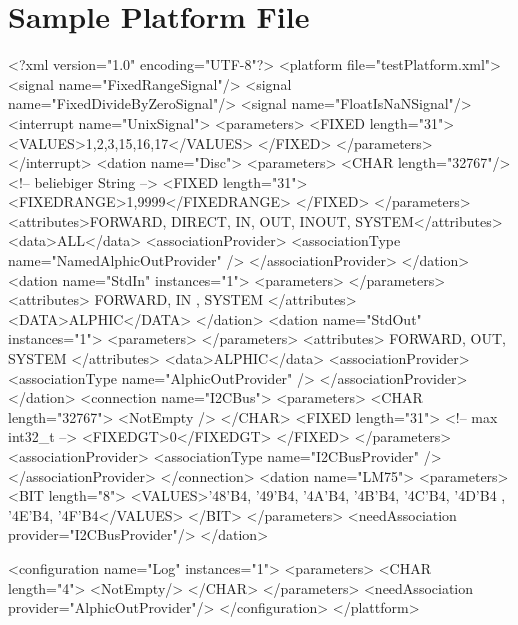 \section{Sample Platform File}
\begin{XMLCode}
<?xml version="1.0" encoding="UTF-8"?>
<platform file="testPlatform.xml">
      <signal name="FixedRangeSignal"/>
      <signal name="FixedDivideByZeroSignal"/>
      <signal name="FloatIsNaNSignal"/>
      <interrupt name="UnixSignal">
         <parameters>
            <FIXED length="31">
               <VALUES>1,2,3,15,16,17</VALUES>
            </FIXED>
         </parameters>
      </interrupt>
      <dation name="Disc">
         <parameters>
            <CHAR length="32767"/>	<!-- beliebiger String -->
            <FIXED length="31">
               <FIXEDRANGE>1,9999</FIXEDRANGE>
            </FIXED>
         </parameters>
         <attributes>FORWARD, DIRECT, IN, OUT, INOUT, SYSTEM</attributes>
         <data>ALL</data>
         <associationProvider>
            <associationType name="NamedAlphicOutProvider" />
         </associationProvider>
      </dation>
      <dation name="StdIn" instances="1">
         <parameters>
         </parameters>
         <attributes>
            FORWARD, IN	, SYSTEM
         </attributes>
         <DATA>ALPHIC</DATA>
      </dation>
      <dation name="StdOut" instances="1">
         <parameters>
         </parameters>
	 <attributes>
            FORWARD, OUT, SYSTEM
         </attributes>
         <data>ALPHIC</data>
         <associationProvider>
            <associationType name="AlphicOutProvider" />
         </associationProvider>
      </dation>
      <connection name="I2CBus">
         <parameters>
            <CHAR length="32767">
               <NotEmpty />
            </CHAR>
            <FIXED length="31">	<!-- max int32_t -->
               <FIXEDGT>0</FIXEDGT>
            </FIXED>
         </parameters>
         <associationProvider>
            <associationType name="I2CBusProvider" />
         </associationProvider>
      </connection>
      <dation name="LM75">
         <parameters>
            <BIT length="8">
               <VALUES>'48'B4, '49'B4, '4A'B4, '4B'B4,
                       '4C'B4, '4D'B4 , '4E'B4, '4F'B4</VALUES>
            </BIT>
         </parameters>
         <needAssociation provider="I2CBusProvider"/>
      </dation>

  <configuration name="Log" instances="1">
    <parameters>
      <CHAR length="4">
         <NotEmpty/>
      </CHAR>
    </parameters>
    <needAssociation provider="AlphicOutProvider"/>
  </configuration>
</plattform>
\end{XMLCode}
